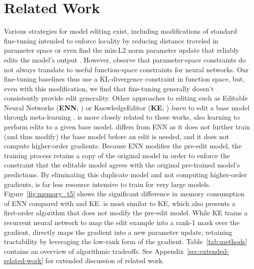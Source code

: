 \documentclass{article}
\begin{document}

\section{Related Work}



Various strategies for model editing exist, including modifications of standard fine-tuning intended to enforce locality by reducing distance traveled in parameter space \citep{zhu2020modifying} or even find the min-L2 norm parameter update that reliably edits the model's output \citep{Sotoudeh2021ProvableRO}. However, \citet{Cao2021EditingFK} observe that parameter-space constraints do not always translate to useful function-space constraints for neural networks. Our fine-tuning baselines thus use a KL-divergence constraint in function space, but, even with this modification, we find that fine-tuning generally doesn't consistently provide edit generality. Other approaches to editing such as Editable Neural Networks (\textbf{ENN}; \citet{Sinitsin2020Editable}) or KnowledgeEditor (\textbf{KE}; \citet{Cao2021EditingFK}) \textit{learn} to edit a base model through meta-learning \citep{finn2017maml,ha2017hyper}. {\name} is more closely related to these works, also learning to perform edits to a given base model. {\name} differs from ENN as it does not further train (and thus modify) the base model before an edit is needed, and it does not compute higher-order gradients. Because ENN modifies the pre-edit model, the training process retains a copy of the original model in order to enforce the constraint that the editable model agrees with the original pre-trained model's predictions. By eliminating this duplicate model and not computing higher-order gradients, {\name} is far less resource intensive to train for very large models. Figure~\ref{fig:memory_t5} shows the significant difference in memory consumption of ENN compared with {\name} and KE\@. {\name} is most similar to KE, which also presents a first-order algorithm that does not modify the pre-edit model. While KE trains a recurrent neural network to map the edit example into a rank-1 mask over the gradient, {\name} directly maps the gradient into a new parameter update, retaining tractability by leveraging the low-rank form of the gradient. Table~\ref{tab:methods} contains an overview of algorithmic tradeoffs. See Appendix~\ref{sec:extended-related-work} for extended discussion of related work.
\end{document}
